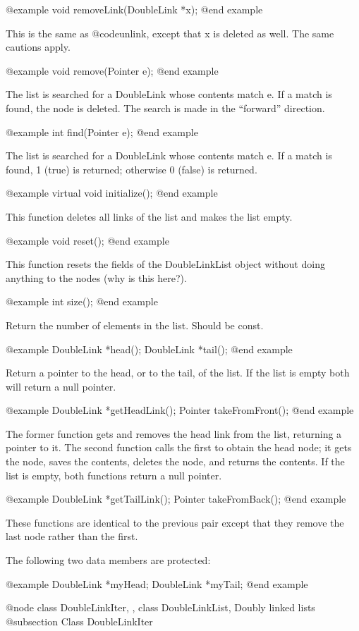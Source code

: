 @example
void removeLink(DoubleLink *x);
@end example

This is the same as @code{unlink}, except that x is deleted
as well.  The same cautions apply.

@example
void remove(Pointer e);
@end example

The list is searched for a DoubleLink whose contents match e.  If
a match is found, the node is deleted.  The search is made in the
``forward'' direction.

@example
int find(Pointer e);
@end example

The list is searched for a DoubleLink whose contents match e.  If
a match is found, 1 (true) is returned; otherwise 0 (false) is
returned.

@example
virtual void initialize();
@end example

This function deletes all links of the list and makes the list empty.

@example
void reset();
@end example

This function resets the fields of the DoubleLinkList object without
doing anything to the nodes (why is this here?).

@example
int size();
@end example

Return the number of elements in the list.  Should be const.

@example
DoubleLink *head();
DoubleLink *tail();
@end example

Return a pointer to the head, or to the tail, of the list.  If
the list is empty both will return a null pointer.

@example
DoubleLink *getHeadLink();
Pointer takeFromFront();
@end example

The former function gets and removes the head link from the list,
returning a pointer to it.  The second function calls the first
to obtain the head node; it gets the node, saves the contents,
deletes the node, and returns the contents.  If the list is empty,
both functions return a null pointer.

@example
DoubleLink *getTailLink();
Pointer takeFromBack();
@end example

These functions are identical to the previous pair except that
they remove the last node rather than the first.

The following two data members are protected:

@example
DoubleLink *myHead;
DoubleLink *myTail;
@end example

@node class DoubleLinkIter,  , class DoubleLinkList, Doubly linked lists
@subsection Class DoubleLinkIter

